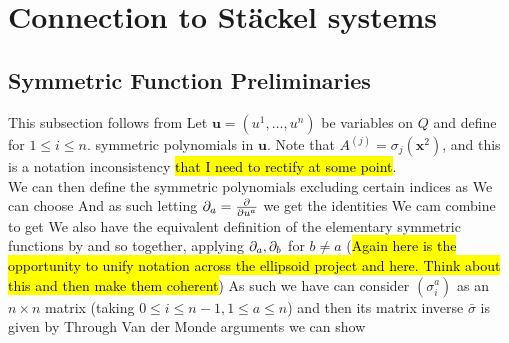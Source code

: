 \documentclass{article}
\begin{document}
\section{Connection to St\"ackel systems}

\subsection{Symmetric Function Preliminaries}
This subsection follows from \cite{Benenti1992InertiaSpaces} Let $\bm{u} = (u^1, \dots, u^n)$ be variables on $Q$ and define 
for $1 \leq i \leq n$. symmetric polynomials in $\bm{u}$. Note that $A^{(j)} = \sigma_j ( \bm{x}^2)$, and this is a notation inconsistency \hl{that I need to rectify at some point}. \\
We can then define the symmetric polynomials excluding certain indices as 
We can choose 
And as such letting $\partial_a = \frac{\partial}{\partial u^a}$ we get the identities 
We cam combine to get 
We also have the equivalent definition of the elementary symmetric functions by 
and so together, applying $\partial_a, \partial_b$ for $b \neq a$
(\hl{Again here is the opportunity to unify notation across the ellipsoid project and here. Think about this and then make them coherent})
As such we have can consider $(\sigma_i^a)$ as an $n \times n$ matrix (taking $0\leq i \leq n-1, 1 \leq a \leq n$) and then its matrix inverse $\bar{\sigma}$ is given by 
Through Van der Monde arguments we can show 
%
\end{document}
